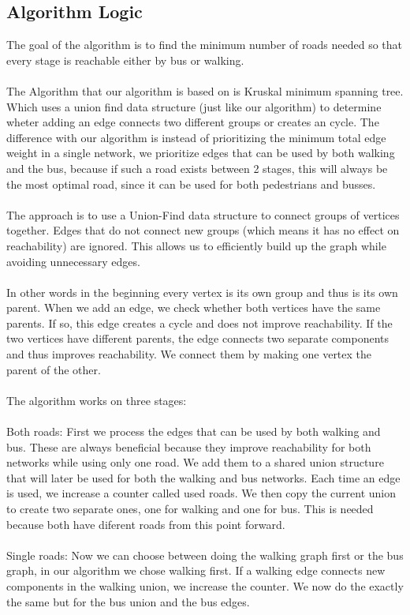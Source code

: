 \documentclass[a4paper]{article}
\begin{document}
\subsection{Algorithm Logic}
The goal of the algorithm is to find the minimum number of roads needed so that every stage is reachable either by bus or walking.
\\
\\
The Algorithm that our algorithm is based on is Kruskal minimum spanning tree. Which uses a union find data structure (just like our algorithm) to determine wheter adding an edge connects two different groups or creates an cycle. The difference with our algorithm is instead of prioritizing the minimum total edge weight in a single network, we prioritize edges that can be used by both walking and the bus, because if such a road exists between 2 stages, this will always be the most optimal road, since it can be used for both pedestrians and busses.
\\
\\
The approach is to use a Union-Find data structure to connect groups of vertices together.
Edges that do not connect new groups (which means it has no effect on reachability) are ignored.
This allows us to efficiently build up the graph while avoiding unnecessary edges.
\\
\\
In other words in the beginning every vertex is its own group and thus is its own parent.
When we add an edge, we check whether both vertices have the same parents. If so, this edge creates a cycle and does not improve reachability.
If the two vertices have different parents, the edge connects two separate components and thus improves reachability. We connect them by making one vertex the parent of the other.
\\
\\
The algorithm works on three stages:
\\
\\
Both roads:
First we process the edges that can be used by both walking and bus.
These are always beneficial because they improve reachability for both networks while using only one road.
We add them to a shared union structure that will later be used for both the walking and bus networks.
Each time an edge is used, we increase a counter called used roads.
We then copy the current union to create two separate ones, one for walking and one for bus.
This is needed because both have diferent roads from this point forward.
\\
\\
Single roads:
Now we can choose between doing the walking graph first or the bus graph, in our algorithm we chose walking first.
If a walking edge connects new components in the walking union, we increase the counter.
We now do the exactly the same but for the bus union and the bus edges.
\end{document}
